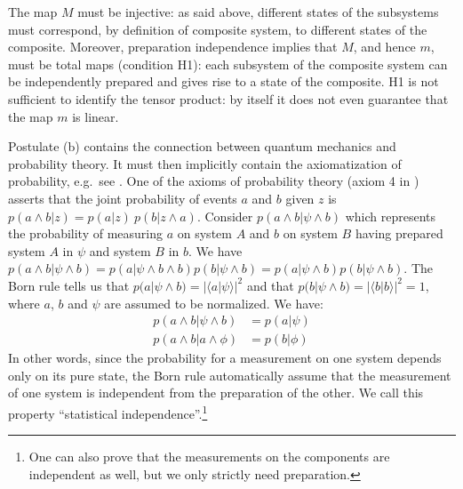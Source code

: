 \documentclass[aps,prl,amsmath,amssymb,twocolumn]{revtex4}
\theoremstyle{plain}
\theoremstyle{definition}
\theoremstyle{remark}
\def\>{\rangle}
\def\<{\langle}
\begin{document}
	The map $M$ must be injective: as said above, different states of the
	subsystems must correspond, by definition of composite system, to
	different states of the composite. Moreover, preparation independence
	implies that $M$, and hence $m$, must be total maps (condition H1): each subsystem of
	the composite system can be independently prepared and gives rise to a
	state of the composite.  H1 is not sufficient
	to identify the tensor product: by itself it does not even guarantee
	that the map $m$ is linear.
	
	Postulate (b) contains the connection between quantum mechanics
	and probability theory. It must then implicitly contain the
	axiomatization of probability, e.g.~see
	\cite{ballentinepaper,ballentinebook,cox}. One of the axioms of
	probability theory (axiom 4 in \cite{ballentinepaper}) asserts that
	the joint probability of events $a$ and $b$ given $z$ is
	$p(a\wedge b|z)=p(a|z)\:p(b|z\wedge a)$. Consider $p(a \wedge b | \psi \wedge b)$ which represents the probability of measuring $a$ on system $A$ and $b$ on system $B$ having prepared system $A$ in $\psi$ and system $B$ in $b$. We have $p(a \wedge b | \psi \wedge b) = p(a | \psi \wedge b \wedge b) p(b | \psi \wedge b) = p(a | \psi \wedge b ) p(b | \psi \wedge b)$. The Born rule tells us that $p(a | \psi \wedge b) = |\<a|\psi\>|^2$ and that $p(b | \psi \wedge b) = |\<b|b\>|^2 = 1$, where $a$, $b$ and $\psi$ are assumed to be normalized. We have:
	\begin{align}
	p(a\wedge b|\psi \wedge b)&=p(a|\psi)\\
	p(a\wedge b|a \wedge \phi)&=p(b|\phi)
	\end{align}
	In other words, since the probability for a measurement on one system depends only on its pure state, the Born rule automatically assume that the measurement of one system is independent from the preparation of the other. We call this property ``statistical independence''.\footnote{One can also prove that the measurements on the components are independent as well, but we only strictly need preparation.}
	
\end{document}
